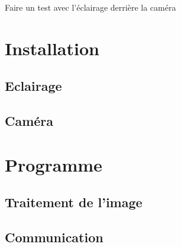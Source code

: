 Faire un test avec l'éclairage derrière la caméra

\section{Installation}
\subsection{Eclairage}

\subsection{Caméra}

\section{Programme}
\subsection{Traitement de l'image}
\subsection{Communication}
